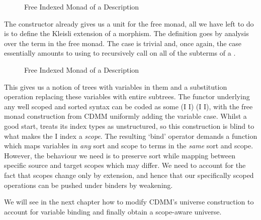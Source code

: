 \begin{figure}[h]
  \caption{Free Indexed Monad of a Description\label{fig:datafreemonad}}
\end{figure}

The  constructor already gives us a unit for the free monad,
all we have left to do is to define the Kleisli extension of a morphism.
The definition goes by analysis over the term in the free monad. The
 case is trivial and, once again, the  case
essentially amounts to using  to recursively call 
on all of the subterms of a .

\begin{figure}[h]
  \caption{Free Indexed Monad of a Description\label{fig:datafreemonad}}
\end{figure}

This gives us a notion of trees with variables in them and a substitution
operation replacing these variables with entire subtrees.
%
The functor underlying any well scoped and sorted syntax can be coded as
some { (I \AR{$\times$}  I) (I \AR{$\times$}  I)},
with the free monad construction from CDMM uniformly adding the variable
case. Whilst a good start,  treats its index types as unstructured,
so this construction is blind to what makes the { I} index a
\emph{scope}. The resulting `bind' operator demands a function which maps
variables in \emph{any} sort and scope to terms in the \emph{same} sort
and scope. However, the behaviour we need is to preserve sort while mapping
between specific source and target scopes which may differ. We need to
account for the fact that scopes change only by extension, and hence that our
specifically scoped operations can be pushed under binders by weakening.

We will see in the next chapter how to modify CDMM's universe construction
to account for variable binding and finally obtain a scope-aware universe.
